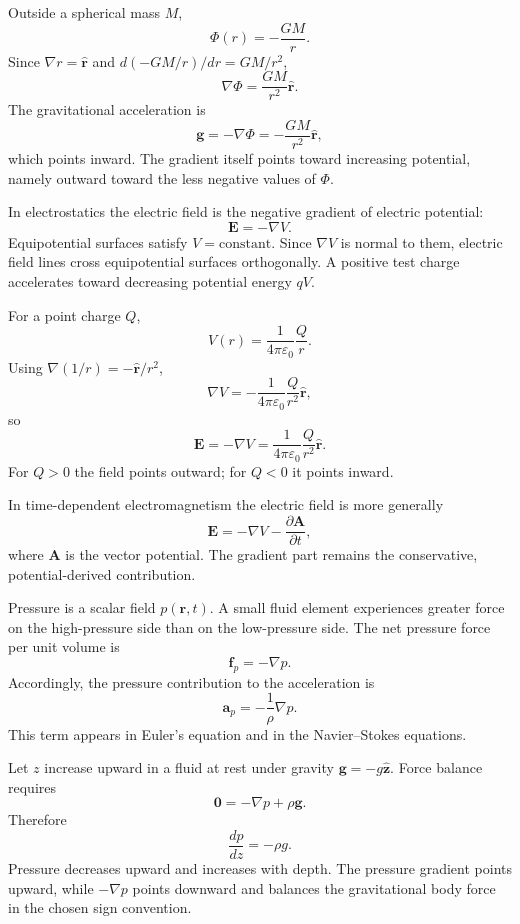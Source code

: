 \begin{bookexample}
Outside a spherical mass $M$,
\[
\Phi(r)=-\frac{GM}{r}.
\]
Since $\nabla r=\hat{\mathbf r}$ and $d(-GM/r)/dr=GM/r^2$,
\[
\nabla\Phi=\frac{GM}{r^2}\hat{\mathbf r}.
\]
The gravitational acceleration is
\[
\mathbf g=-\nabla\Phi
=-\frac{GM}{r^2}\hat{\mathbf r},
\]
which points inward. The gradient itself points toward increasing potential, namely outward toward the less negative values of $\Phi$.
\end{bookexample}


In electrostatics the electric field is the negative gradient of electric potential:
\[
\boxed{\mathbf E=-\nabla V.}
\]
Equipotential surfaces satisfy $V=\text{constant}$. Since $\nabla V$ is normal to them, electric field lines cross equipotential surfaces orthogonally. A positive test charge accelerates toward decreasing potential energy $qV$.

\begin{bookexample}
For a point charge $Q$,
\[
V(r)=\frac{1}{4\pi\varepsilon_0}\frac{Q}{r}.
\]
Using $\nabla(1/r)=-\hat{\mathbf r}/r^2$,
\[
\nabla V
=-\frac{1}{4\pi\varepsilon_0}\frac{Q}{r^2}\hat{\mathbf r},
\]
so
\[
\mathbf E=-\nabla V
=\frac{1}{4\pi\varepsilon_0}\frac{Q}{r^2}\hat{\mathbf r}.
\]
For $Q>0$ the field points outward; for $Q<0$ it points inward.
\end{bookexample}

In time-dependent electromagnetism the electric field is more generally
\[
\mathbf E=-\nabla V-\frac{\partial\mathbf A}{\partial t},
\]
where $\mathbf A$ is the vector potential. The gradient part remains the conservative, potential-derived contribution.


Pressure is a scalar field $p(\mathbf r,t)$. A small fluid element experiences greater force on the high-pressure side than on the low-pressure side. The net pressure force per unit volume is
\[
\boxed{\mathbf f_p=-\nabla p.}
\]
Accordingly, the pressure contribution to the acceleration is
\[
\mathbf a_p=-\frac{1}{\rho}\nabla p.
\]
This term appears in Euler's equation and in the Navier--Stokes equations.

\begin{bookexample}
Let $z$ increase upward in a fluid at rest under gravity $\mathbf g=-g\hat{\mathbf z}$. Force balance requires
\[
\mathbf0=-\nabla p+\rho\mathbf g.
\]
Therefore
\[
\frac{dp}{dz}=-\rho g.
\]
Pressure decreases upward and increases with depth. The pressure gradient points upward, while $-\nabla p$ points downward and balances the gravitational body force in the chosen sign convention.
\end{bookexample}


